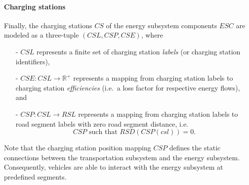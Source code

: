 \paragraph{Charging stations}
\label{charging_stations}

Finally, the charging stations $CS$ of the energy subsystem components $ESC$ are modeled as a three-tuple $(CSL, CSP, CSE)$, where
\begin{itemize}
	\item[-] $CSL$ represents a finite set of charging station \textit{labels} (or charging station identifiers),
	\item[-] $CSE: CSL \rightarrow \mathbb{R}^+$ represents a mapping from charging station labels to charging station \textit{efficiencies} (i.e.\ a loss factor for respective energy flows), and
	\item[-] $CSP: CSL \rightarrow RSL$ represents a mapping from charging station labels to road segment labels with zero road segment distance, i.e.\
	\[
		CSP \textrm{ such that } RSD(CSP(csl)) = 0 \textrm{.}
	\]
\end{itemize}
Note that the charging station position mapping $CSP$ defines the static connections between the transportation subsystem and the energy subsystem. Consequently, vehicles are able to interact with the energy subsystem at predefined segments.
